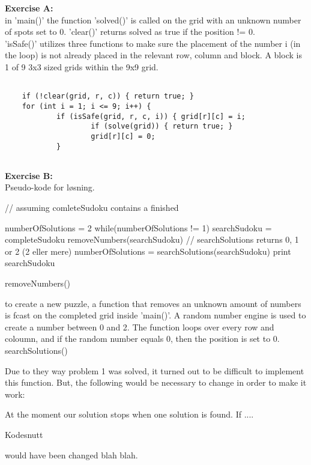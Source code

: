 \documentclass[11pt]{amsart}
\begin{document}
\textbf{Exercise A:} \\

in 'main()' the function 'solved()' is called on the grid with an unknown number of
spots set to 0. 'clear()' returns solved as true if the position != 0. \\
'isSafe()' utilizes three functions to make sure the placement of the number i (in the loop) is
not already placed in the relevant row, column and block. A block is 1 of 9 3x3 sized grids within
the 9x9 grid. \\


\begin{verbatim}

 	if (!clear(grid, r, c)) { return true; }
 	for (int i = 1; i <= 9; i++) {
 			if (isSafe(grid, r, c, i)) { grid[r][c] = i;
 					if (solve(grid)) { return true; }
 					grid[r][c] = 0;
 			}


\end{verbatim}


\textbf{Exercise B:} \\


Pseudo-kode for løsning.

// assuming comleteSudoku contains a finished

numberOfSolutions = 2
while(numberOfSolutions != 1)
  searchSudoku = completeSudoku
  removeNumbers(searchSudoku)
	// searchSolutions returns 0, 1 or 2 (2 eller mere)
  numberOfSolutions = searchSolutions(searchSudoku)
print searchSudoku


removeNumbers()

to create a new puzzle, a function that removes an unknown amount of numbers is
fcast on the completed grid inside 'main()'. A random number engine is used to create a number
between 0 and 2. The function loops over every row and coloumn, and if the random number
equals 0, then the position is set to 0. \\


searchSolutions()

Due to they way problem 1 was solved, it turned out to be difficult to implement this function.
But, the following would be necessary to change in order to make it work:

At the moment our solution stops when one solution is found. If ....

Kodesnutt

would have been changed blah blah.
\end{document}
